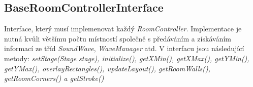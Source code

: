 \subsection{BaseRoomControllerInterface}
Interface, který musí implemenovat každý \textit{RoomController}. Implementace je nutná kvůli většímu počtu místností společně s předáváním a získáváním informací ze tříd \textit{SoundWave}, \textit{WaveManager} atd. V interfacu jsou následující metody: \textit{setStage(Stage stage), initialize(), getXMin(), getXMax(), getYMin(), getYMax(), overlayRectangles(), updateLayout(), getRoomWalls(), getRoomCorners() a getStroke()}